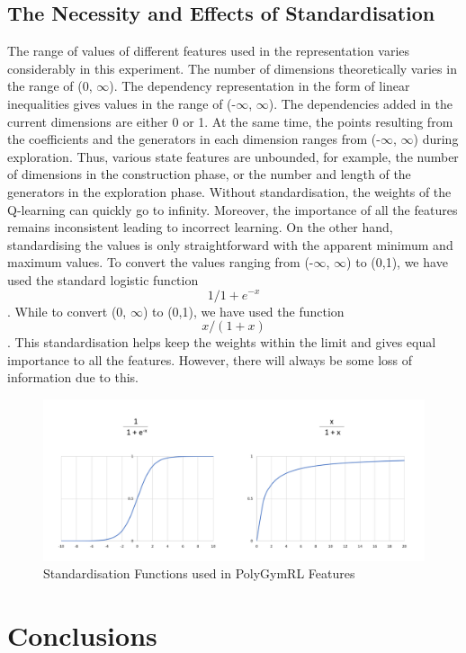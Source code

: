 \documentclass[logo,msc]{infthesis}           %
\begin{document}
\section{The Necessity and Effects of Standardisation}
The range of values of different features used in the representation varies considerably in this experiment. The number of dimensions theoretically varies in the range of (0, $\infty$). The dependency representation in the form of linear inequalities gives values in the range of (-$\infty$, $\infty$). The dependencies added in the current dimensions are either 0 or 1. At the same time, the points resulting from the coefficients and the generators in each dimension ranges from (-$\infty$, $\infty$) during exploration. Thus, various state features are unbounded, for example, the number of dimensions in the construction phase, or the number and length of the generators in the exploration phase. Without standardisation, the weights of the Q-learning can quickly go to infinity. Moreover, the importance of all the features remains inconsistent leading to incorrect learning. On the other hand, standardising the values is only straightforward with the apparent minimum and maximum values. To convert the values ranging from (-$\infty$, $\infty$) to (0,1), we have used the standard logistic function \[{1/1+e^{-x}}\]. While to convert (0, $\infty$) to (0,1), we have used the function \[{x / (1 + x)}\]. This standardisation helps keep the weights within the limit and gives equal importance to all the features. However, there will always be some loss of information due to this.

\begin{figure}[htbp]
  \centering
  \includegraphics[width=\textwidth]{Images/Standardisation.png}    
  \caption{Standardisation Functions used in PolyGymRL Features}
  \label{fig:Standardisation}
\end{figure}


\chapter{Conclusions}
\end{document}
